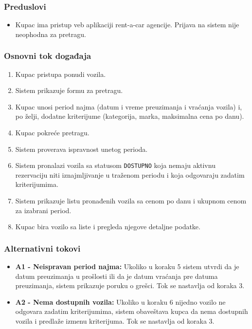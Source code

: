 \documentclass[a4paper,12pt]{article}
\begin{document}
\subsubsection{Preduslovi}

\begin{itemize}
    \item Kupac ima pristup veb aplikaciji rent-a-car agencije. Prijava na sistem nije neophodna za pretragu.
\end{itemize}

\subsubsection{Osnovni tok događaja}

\begin{enumerate}
    \item Kupac pristupa ponudi vozila.
    \item Sistem prikazuje formu za pretragu.
    \item Kupac unosi period najma (datum i vreme preuzimanja i vraćanja vozila) i, po želji, dodatne kriterijume (kategorija, marka, maksimalna cena po danu).
    \item Kupac pokreće pretragu.
    \item Sistem proverava ispravnost unetog perioda.
    \item Sistem pronalazi vozila sa statusom \texttt{DOSTUPNO} koja nemaju aktivnu rezervaciju niti iznajmljivanje u traženom periodu i koja odgovaraju zadatim kriterijumima.
    \item Sistem prikazuje listu pronađenih vozila sa cenom po danu i ukupnom cenom za izabrani period.
    \item Kupac bira vozilo sa liste i pregleda njegove detaljne podatke.
\end{enumerate}

\subsubsection{Alternativni tokovi}

\begin{itemize}
    \item \textbf{A1 - Neispravan period najma:}
    Ukoliko u koraku 5 sistem utvrdi da je datum preuzimanja u prošlosti ili da je datum vraćanja pre datuma preuzimanja, sistem prikazuje poruku o grešci. Tok se nastavlja od koraka 3.

    \item \textbf{A2 - Nema dostupnih vozila:}
    Ukoliko u koraku 6 nijedno vozilo ne odgovara zadatim kriterijumima, sistem obaveštava kupca da nema dostupnih vozila i predlaže izmenu kriterijuma. Tok se nastavlja od koraka 3.
\end{itemize}
\end{document}
